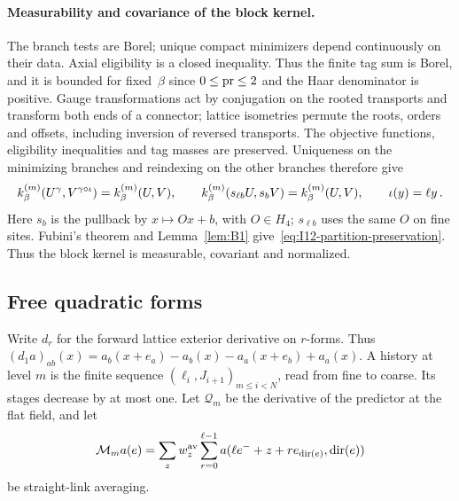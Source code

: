 \paragraph{Measurability and covariance of the block kernel.}
The branch tests are Borel; unique compact minimizers depend continuously on their data. Axial eligibility is a closed inequality. Thus the finite tag sum is Borel, and it is bounded for fixed~$\beta$ since $0\le\operatorname{pr}\le2$ and the Haar denominator is positive. Gauge transformations act by conjugation on the rooted transports and transform both ends of a connector; lattice isometries permute the roots, orders and offsets, including inversion of reversed transports. The objective functions, eligibility inequalities and tag masses are preserved. Uniqueness on the minimizing branches and reindexing on the other branches therefore give
\begin{equation*}
k^{(m)}_\beta(U^\gamma,V^{\gamma\circ\iota})=k^{(m)}_\beta(U,V),\qquad
k^{(m)}_\beta(s_{\ell b}U,s_bV)=k^{(m)}_\beta(U,V),\qquad \iota(y)=\ell y\,.
\end{equation*}
Here $s_b$ is the pullback by $x\mapsto Ox+b$, with $O\in H_4$; $s_{\ell b}$ uses the same $O$ on fine sites. Fubini's theorem and Lemma~\ref{lem:B1} give~\eqref{eq:I12-partition-preservation}. Thus the block kernel is measurable, covariant and normalized.

\subsection{Free quadratic forms}\label{subsec:B-free}

Write $d_r$ for the forward lattice exterior derivative on $r$-forms. Thus $(d_1a)_{ab}(x)=a_b(x+e_a)-a_b(x)-a_a(x+e_b)+a_a(x)$. A history at level $m$ is the finite sequence $(\ell_i,J_{i+1})_{m\le i<N}$, read from fine to coarse. Its stages decrease by at most one. Let $\mathcal Q_m$ be the derivative of the predictor at the flat field, and let
\begin{equation*}
\mathcal M_ma(e)=\sum_z w_z^{\rm av}\sum_{r=0}^{\ell-1}a(\ell e^-+z+re_{\operatorname{dir}(e)},\operatorname{dir}(e))
\end{equation*}
be straight-link averaging.


